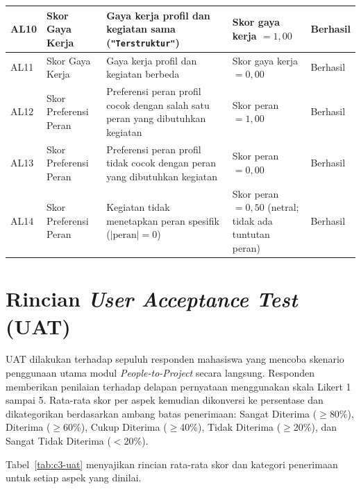 \begin{longtable}{p{} p{} p{} p{} p{}}
\midrule
AL10 & Skor Gaya Kerja & Gaya kerja profil dan kegiatan sama (\texttt{"Terstruktur"}) & Skor gaya kerja $= 1{,}00$ & Berhasil \\
\midrule
AL11 & Skor Gaya Kerja & Gaya kerja profil dan kegiatan berbeda & Skor gaya kerja $= 0{,}00$ & Berhasil \\
\midrule
AL12 & Skor Preferensi Peran & Preferensi peran profil cocok dengan salah satu peran yang dibutuhkan kegiatan & Skor peran $= 1{,}00$ & Berhasil \\
\midrule
AL13 & Skor Preferensi Peran & Preferensi peran profil tidak cocok dengan peran yang dibutuhkan kegiatan & Skor peran $= 0{,}00$ & Berhasil \\
\midrule
AL14 & Skor Preferensi Peran & Kegiatan tidak menetapkan peran spesifik ($|\text{peran}| = 0$) & Skor peran $= 0{,}50$ (netral; tidak ada tuntutan peran) & Berhasil \\
\end{longtable}

\section{Rincian \emph{User Acceptance Test} (UAT)}
\label{sec:c-uat}

UAT dilakukan terhadap sepuluh responden mahasiswa yang mencoba skenario penggunaan utama modul \emph{People-to-Project} secara langsung. Responden memberikan penilaian terhadap delapan pernyataan menggunakan skala Likert 1 sampai 5. Rata-rata skor per aspek kemudian dikonversi ke persentase dan dikategorikan berdasarkan ambang batas penerimaan: Sangat Diterima ($\geq$80\%), Diterima ($\geq$60\%), Cukup Diterima ($\geq$40\%), Tidak Diterima ($\geq$20\%), dan Sangat Tidak Diterima ($<$20\%).

Tabel~\ref{tab:c3-uat} menyajikan rincian rata-rata skor dan kategori penerimaan untuk setiap aspek yang dinilai.

